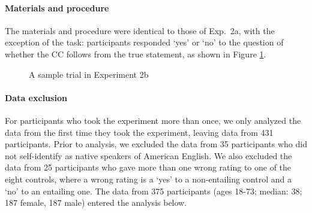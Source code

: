 \documentclass[11pt,fleqn]{article}
\newcommand{\6}{\mbox{$[\hspace*{-.6mm}[$}}
\newcommand{\9}{\mbox{$]\hspace*{-.6mm}]$}}
\begin{document}
\paragraph{Materials and procedure} The materials and procedure were identical to those of Exp.~2a, with the exception of the task: participants responded `yes' or `no' to the question of whether the CC follows from the true statement, as shown in Figure \ref{fig-trial-exp2b}.

\begin{figure}[h!]
\begin{center}
\end{center}
\caption{A sample trial in Experiment 2b}\label{fig-trial-exp2b}
\end{figure}


\paragraph{Data exclusion} For participants who took the experiment more than once, we only analyzed the data from the first time they took the experiment, leaving data from 431 participants. Prior to analysis, we excluded the data from 35 participants who did not self-identify as native speakers of American English. We also excluded the data from 25 participants who gave more than one wrong rating to one of the eight controls, where a wrong rating is a `yes' to a non-entailing control and a `no' to an entailing one. The data from 375 participants (ages 18-73; median: 38; 187 female, 187 male) entered the analysis below. 
    
\end{document}
